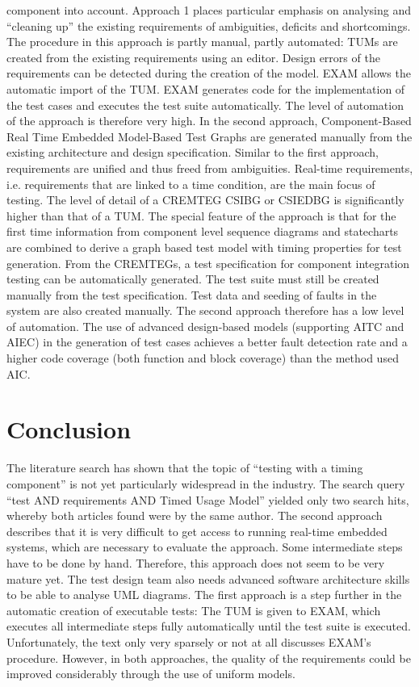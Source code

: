 component into account. Approach 1 places particular emphasis on analysing
and \enquote{cleaning up} the existing requirements
of ambiguities, deficits and shortcomings. The procedure in this approach
is partly manual, partly automated: TUMs are created from the existing
requirements using an editor. Design errors of the requirements can
be detected during the creation of the model. EXAM allows the automatic
import of the TUM. EXAM generates code for the implementation of the
test cases and executes the test suite automatically. The level of
automation of the approach is therefore very high. In the second approach,
Component-Based Real Time Embedded Model-Based Test Graphs are generated
manually from the existing architecture and design specification.
Similar to the first approach, requirements are unified and thus freed
from ambiguities. Real-time requirements, i.e. requirements that are
linked to a time condition, are the main focus of testing. The level
of detail of a CREMTEG CSIBG or CSIEDBG is significantly higher than
that of a TUM. The special feature of the approach is that for the
first time information from component level sequence diagrams and
statecharts are combined to derive a graph based test model with timing
properties for test generation. From the CREMTEGs, a test specification
for component integration testing can be automatically generated.
The test suite must still be created manually from the test specification.
Test data and seeding of faults in the system are also created manually.
The second approach therefore has a low level of automation. The use
of advanced design-based models (supporting AITC and AIEC) in the
generation of test cases achieves a better fault detection rate and
a higher code coverage (both function and block coverage) than the
method used AIC.

\section{Conclusion\label{sec:topic_4_Conclusion}}

The literature search has shown that the topic of \enquote{testing
with a timing component} is not yet particularly widespread
in the industry. The search query \enquote{test AND requirements
AND Timed Usage Model} yielded only two
search hits, whereby both articles found were by the same author.
The second approach describes that it is very difficult to get access
to running real-time embedded systems, which are necessary to evaluate
the approach. Some intermediate steps have to be done by hand. Therefore,
this approach does not seem to be very mature yet. The test design
team also needs advanced software architecture skills to be able to
analyse UML diagrams. The first approach is a step further in the
automatic creation of executable tests: The TUM is given to EXAM,
which executes all intermediate steps fully automatically until the
test suite is executed. Unfortunately, the text only very sparsely
or not at all discusses EXAM's procedure. However, in both approaches,
the quality of the requirements could be improved considerably through
the use of uniform models.\\
\nocite{*}
